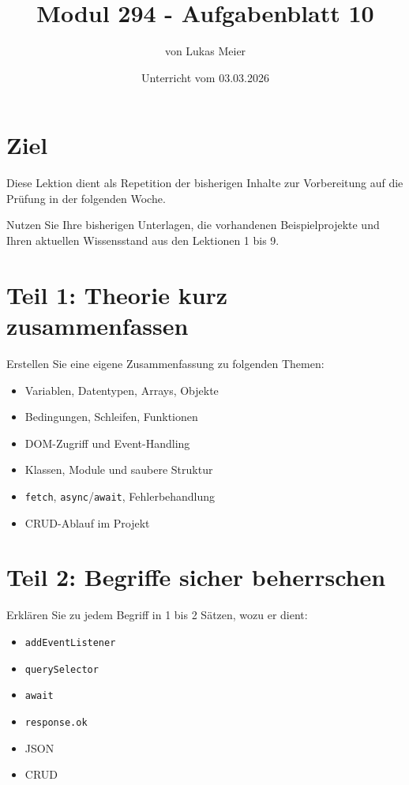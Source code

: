 \documentclass[a4paper,12pt]{article}
\title{Modul 294 - Aufgabenblatt 10}
\author{von Lukas Meier}
\date{Unterricht vom 03.03.2026}
\begin{document}
\maketitle

\section{Ziel}

Diese Lektion dient als Repetition der bisherigen Inhalte zur Vorbereitung auf die Prüfung in der folgenden Woche.

Nutzen Sie Ihre bisherigen Unterlagen, die vorhandenen Beispielprojekte und Ihren aktuellen Wissensstand aus den Lektionen 1 bis 9.

\section{Teil 1: Theorie kurz zusammenfassen}

Erstellen Sie eine eigene Zusammenfassung zu folgenden Themen:
\begin{itemize}
    \item Variablen, Datentypen, Arrays, Objekte
    \item Bedingungen, Schleifen, Funktionen
    \item DOM-Zugriff und Event-Handling
    \item Klassen, Module und saubere Struktur
    \item \texttt{fetch}, \texttt{async}/\texttt{await}, Fehlerbehandlung
    \item CRUD-Ablauf im Projekt
\end{itemize}

\section{Teil 2: Begriffe sicher beherrschen}

Erklären Sie zu jedem Begriff in 1 bis 2 Sätzen, wozu er dient:
\begin{itemize}
    \item \texttt{addEventListener}
    \item \texttt{querySelector}
    \item \texttt{await}
    \item \texttt{response.ok}
    \item JSON
    \item CRUD
\end{itemize}
\end{document}

